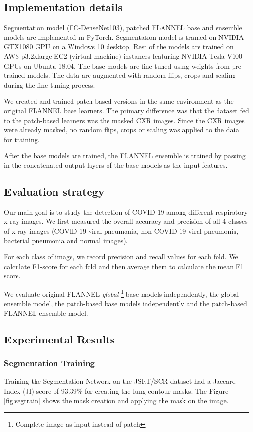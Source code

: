 \documentclass{sigkddExp}
\begin{document}
\subsection{Implementation details}
Segmentation model (FC-DenseNet103), patched FLANNEL base and ensemble models
are implemented in PyTorch. Segmentation model is trained on NVIDIA GTX1080 GPU
on a Windows 10 desktop. Rest of the models are trained on AWS p3.2xlarge EC2
(virtual machine) instances featuring NVIDIA Tesla V100 GPUs on Ubuntu 18.04.
The base models are fine tuned using weights from pre-trained
models. The data are augmented with random flips, crops and scaling during the
fine tuning process.

We created and trained patch-based versions in the same environment as the
original FLANNEL base learners. The primary difference was that the dataset fed
to the patch-based learners was the masked CXR images. Since the CXR images were
already masked, no random flips, crops or scaling was applied to the data for
training.

After the base models are trained, the FLANNEL ensemble is trained by passing in
the concatenated output layers of the base models as the input features.

\subsection{Evaluation strategy}
Our main goal is to study the detection of COVID-19 among different respiratory
x-ray images. We first measured the overall accuracy and precision of all 4
classes of x-ray images (COVID-19 viral pneumonia, non-COVID-19 viral pneumonia,
bacterial pneumonia and normal images).

For each class of image, we record precision and recall values for each fold.
We calculate F1-score for each fold and then average them to calculate the mean
F1 score.

We evaluate original FLANNEL \textit{global} \footnote{Complete image as input
    instead of patch} base models independently, the global ensemble model, the
patch-based base models independently and the patch-based FLANNEL ensemble model.

\subsection{Experimental Results}
\subsubsection{Segmentation Training}
Training the Segmentation Network on the JSRT/SCR dataset had a Jaccard Index
(JI) score of 93.39\% for creating the lung contour masks. The Figure \ref{fig:segtrain}
shows the mask creation and applying the mask on the image.
\end{document}
